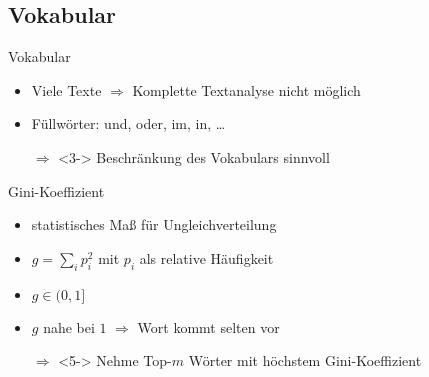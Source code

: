 \subsection{Vokabular}
\begin{frame}{Vokabular}
    \begin{itemize}
        \item<1-> Viele Texte $\Rightarrow$ Komplette Textanalyse nicht möglich
        \item<2-> Füllwörter: und, oder, im, in, \dots
        \item[$\Rightarrow$]<3-> Beschränkung des Vokabulars sinnvoll
    \end{itemize}

\end{frame}

\begin{frame}{Gini-Koeffizient}
    \begin{itemize}
        \item<1-> statistisches Maß für Ungleichverteilung
        \item<2-> $g = \sum_i p_i^2$ mit $p_i$ als relative Häufigkeit
        \item<3-> $g \in (0, 1]$
        \item<4-> $g$ nahe bei $1$ $\Rightarrow$ Wort kommt selten vor
        \item[$\Rightarrow$]<5-> Nehme Top-$m$ Wörter mit höchstem
                  Gini-Koeffizient
    \end{itemize}
\end{frame}
